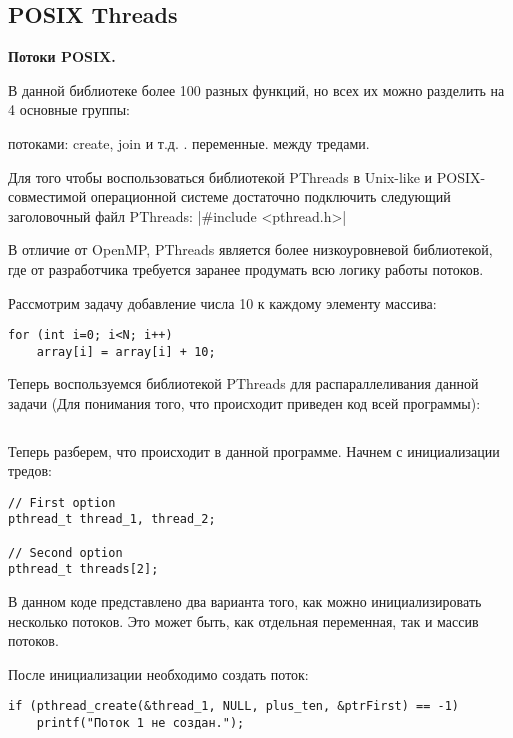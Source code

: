 \subsection{POSIX Threads}
\label{PThreads:section}

\textbf{Потоки POSIX.} 

В данной библиотеке более 100 разных функций, но всех их можно разделить на 4 основные группы:

\begin{itemize}
     потоками: create, join и т.д.
    .
     переменные.
     между тредами.
\end{itemize}

Для того чтобы воспользоваться библиотекой PThreads в Unix-like и POSIX-совместимой операционной системе достаточно подключить следующий заголовочный файл PThreads: 
|#include <pthread.h>|

В отличие от OpenMP, PThreads является более низкоуровневой библиотекой, где от разработчика требуется заранее продумать всю логику работы потоков.

Рассмотрим задачу добавление числа 10 к каждому элементу массива:

\begin{verbatim}
for (int i=0; i<N; i++)
    array[i] = array[i] + 10;
\end{verbatim}

Теперь воспользуемся библиотекой PThreads для распараллеливания данной задачи (Для понимания того, что происходит приведен код всей программы):

\inputminted{c++}{listings/WithPosix.c}

Теперь разберем, что происходит в данной программе. Начнем с инициализации тредов:

\begin{verbatim}
// First option
pthread_t thread_1, thread_2;

// Second option
pthread_t threads[2];
\end{verbatim}

В данном коде представлено два варианта того, как можно инициализировать несколько потоков. Это может быть, как отдельная переменная, так и массив потоков.

После инициализации необходимо создать поток:

\begin{verbatim}
if (pthread_create(&thread_1, NULL, plus_ten, &ptrFirst) == -1)
    printf("Поток 1 не создан.");
\end{verbatim}

